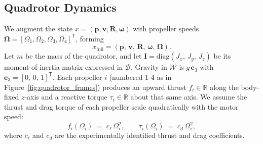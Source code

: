 \subsection{Quadrotor Dynamics}
\label{sec:quadrotor_dynamics}
We augment the state \(x=(\mathbf{p},\mathbf{v},\mathbf{R},\boldsymbol{\omega})\) with propeller speeds \(\boldsymbol{\Omega}=[\Omega_1,\Omega_2,\Omega_3,\Omega_4]^\mathsf{T}\), forming
\begin{equation}
x_{\mathrm{full}} = (\mathbf{p},\,\mathbf{v},\,\mathbf{R},\,\boldsymbol{\omega},\,\boldsymbol{\Omega}).
\end{equation}
Let \(m\) be the mass of the quadrotor, and let \(\mathbf{I} = \mathrm{diag}(J_{x},\,J_{y},\,J_{z})\) be its moment-of-inertia matrix expressed in \(\mathcal{B}\). Gravity in \(\mathcal{W}\) is \(g\,\mathbf{e}_{3}\) with \(\mathbf{e}_{3} = [0,\,0,\,1]^{\mathsf{T}}\). Each propeller \(i\) (numbered 1-4 as in Figure~\ref{fig:quadrotor_frames}) produces an upward thrust \(f_{i} \in \mathbb{R}\) along the body-fixed \(z\)-axis and a reactive torque \(\tau_{i}\in \mathbb{R}\) about that same axis. We assume the thrust and drag torque of each propeller scale quadratically with the motor speed:
\begin{equation}
f_{i}(\Omega_{i}) \;=\; c_{\ell}\,\Omega_{i}^{2}, 
\qquad 
\tau_{i}(\Omega_{i}) \;=\; c_{d}\,\Omega_{i}^{2},
\end{equation}
where \(c_{\ell}\) and \(c_{d}\) are the experimentally identified thrust and drag coefficients.

